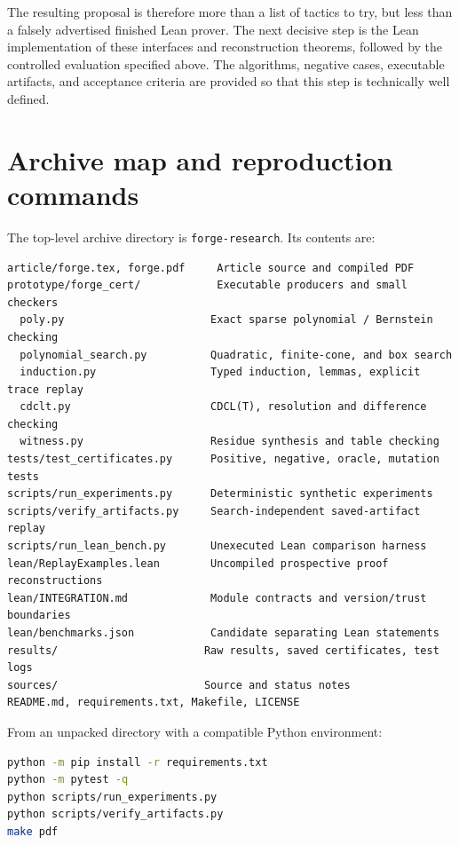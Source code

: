 \documentclass[11pt,letterpaper]{article}
\newcommand{\code}[1]{\texttt{#1}}
\theoremstyle{definition}\newtheorem{definition}[theorem]{Definition}
\theoremstyle{remark}\newtheorem{remark}[theorem]{Remark}
\begin{document}
The resulting proposal is therefore more than a list of tactics to try, but less than a falsely advertised finished Lean prover. The next decisive step is the Lean implementation of these interfaces and reconstruction theorems, followed by the controlled evaluation specified above. The algorithms, negative cases, executable artifacts, and acceptance criteria are provided so that this step is technically well defined.

\appendix
\section{Archive map and reproduction commands}
The top-level archive directory is \code{forge-research}. Its contents are:
\par\noindent
\begin{minipage}{\linewidth}
\begin{lstlisting}
article/forge.tex, forge.pdf     Article source and compiled PDF
prototype/forge_cert/            Executable producers and small checkers
  poly.py                       Exact sparse polynomial / Bernstein checking
  polynomial_search.py          Quadratic, finite-cone, and box search
  induction.py                  Typed induction, lemmas, explicit trace replay
  cdclt.py                      CDCL(T), resolution and difference checking
  witness.py                    Residue synthesis and table checking
tests/test_certificates.py      Positive, negative, oracle, mutation tests
scripts/run_experiments.py      Deterministic synthetic experiments
scripts/verify_artifacts.py     Search-independent saved-artifact replay
scripts/run_lean_bench.py       Unexecuted Lean comparison harness
lean/ReplayExamples.lean        Uncompiled prospective proof reconstructions
lean/INTEGRATION.md             Module contracts and version/trust boundaries
lean/benchmarks.json            Candidate separating Lean statements
results/                       Raw results, saved certificates, test logs
sources/                       Source and status notes
README.md, requirements.txt, Makefile, LICENSE
\end{lstlisting}
\end{minipage}\par

From an unpacked directory with a compatible Python environment:
\par\noindent
\begin{minipage}{\linewidth}
\begin{lstlisting}[language=bash]
python -m pip install -r requirements.txt
python -m pytest -q
python scripts/run_experiments.py
python scripts/verify_artifacts.py
make pdf
\end{lstlisting}
\end{minipage}\par
\end{document}
